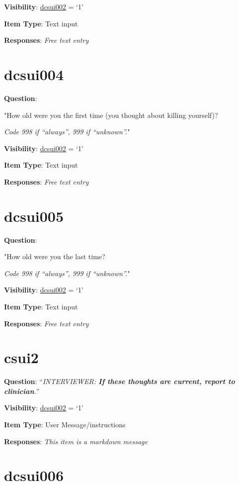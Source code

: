 \documentclass[]{book}
\begin{document}
\textbf{Visibility}: \protect\hyperlink{dcsui002}{dcsui002} = `1'

\textbf{Item Type}: Text input

\textbf{Responses}: \emph{Free text entry}

\hypertarget{dcsui004}{%
\section{dcsui004}\label{dcsui004}}

\textbf{Question}:

"How old were you the first time (you thought about killing yourself)?

\emph{Code 998 if ``always'', 999 if ``unknown''.}"

\textbf{Visibility}: \protect\hyperlink{dcsui002}{dcsui002} = `1'

\textbf{Item Type}: Text input

\textbf{Responses}: \emph{Free text entry}

\hypertarget{dcsui005}{%
\section{dcsui005}\label{dcsui005}}

\textbf{Question}:

"How old were you the last time?

\emph{Code 998 if ``always'', 999 if ``unknown''.}"

\textbf{Visibility}: \protect\hyperlink{dcsui002}{dcsui002} = `1'

\textbf{Item Type}: Text input

\textbf{Responses}: \emph{Free text entry}

\hypertarget{csui2}{%
\section{csui2}\label{csui2}}

\textbf{Question}: ``\emph{INTERVIEWER: \textbf{If these thoughts are current, report to clinician}.}''

\textbf{Visibility}: \protect\hyperlink{dcsui002}{dcsui002} = `1'

\textbf{Item Type}: User Message/instructions

\textbf{Responses}: \emph{This item is a markdown message}

\hypertarget{dcsui006}{%
\section{dcsui006}\label{dcsui006}}
\end{document}
